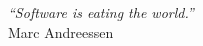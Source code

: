 \cleardoublepage
\thispagestyle{plain}

\vspace*{8cm}

\begin{flushright}
   \textsl{``Software is eating the world.''} \\
\vspace*{1.5cm}
           Marc Andreessen
\end{flushright}
